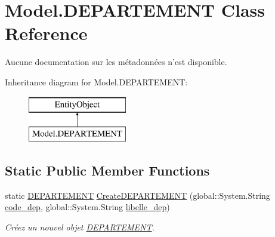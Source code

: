 \hypertarget{class_model_1_1_d_e_p_a_r_t_e_m_e_n_t}{\section{Model.\-D\-E\-P\-A\-R\-T\-E\-M\-E\-N\-T Class Reference}
\label{class_model_1_1_d_e_p_a_r_t_e_m_e_n_t}
}


Aucune documentation sur les métadonnées n'est disponible.  


Inheritance diagram for Model.\-D\-E\-P\-A\-R\-T\-E\-M\-E\-N\-T\-:\begin{figure}[H]
\begin{center}
\leavevmode
\includegraphics[height=2.000000cm]{class_model_1_1_d_e_p_a_r_t_e_m_e_n_t}
\end{center}
\end{figure}
\subsection*{Static Public Member Functions}
\begin{DoxyCompactItemize}
\item 
static \hyperlink{class_model_1_1_d_e_p_a_r_t_e_m_e_n_t}{D\-E\-P\-A\-R\-T\-E\-M\-E\-N\-T} \hyperlink{class_model_1_1_d_e_p_a_r_t_e_m_e_n_t_ac962c3ed325dec487f12f148711dccea}{Create\-D\-E\-P\-A\-R\-T\-E\-M\-E\-N\-T} (global\-::\-System.\-String \hyperlink{class_model_1_1_d_e_p_a_r_t_e_m_e_n_t_a2f34735310ea76c3f5b6cf158b85c314}{code\-\_\-dep}, global\-::\-System.\-String \hyperlink{class_model_1_1_d_e_p_a_r_t_e_m_e_n_t_aa1736783b4b382723941604c85f83a3f}{libelle\-\_\-dep})
\begin{DoxyCompactList}\small\item\em Créez un nouvel objet \hyperlink{class_model_1_1_d_e_p_a_r_t_e_m_e_n_t}{D\-E\-P\-A\-R\-T\-E\-M\-E\-N\-T}. \end{DoxyCompactList}\end{DoxyCompactItemize}
